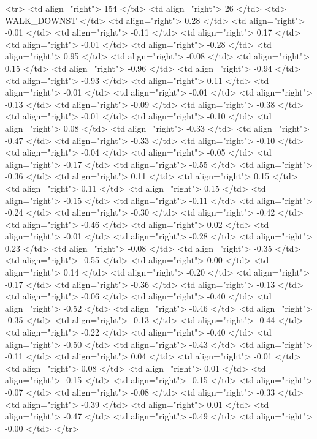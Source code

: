   <tr> <td align="right"> 154 </td> <td align="right">  26 </td> <td> WALK_DOWNST </td> <td align="right"> 0.28 </td> <td align="right"> -0.01 </td> <td align="right"> -0.11 </td> <td align="right"> 0.17 </td> <td align="right"> -0.01 </td> <td align="right"> -0.28 </td> <td align="right"> 0.95 </td> <td align="right"> -0.08 </td> <td align="right"> 0.15 </td> <td align="right"> -0.96 </td> <td align="right"> -0.94 </td> <td align="right"> -0.93 </td> <td align="right"> 0.11 </td> <td align="right"> -0.01 </td> <td align="right"> -0.01 </td> <td align="right"> -0.13 </td> <td align="right"> -0.09 </td> <td align="right"> -0.38 </td> <td align="right"> -0.01 </td> <td align="right"> -0.10 </td> <td align="right"> 0.08 </td> <td align="right"> -0.33 </td> <td align="right"> -0.47 </td> <td align="right"> -0.33 </td> <td align="right"> -0.10 </td> <td align="right"> -0.04 </td> <td align="right"> -0.05 </td> <td align="right"> -0.17 </td> <td align="right"> -0.55 </td> <td align="right"> -0.36 </td> <td align="right"> 0.11 </td> <td align="right"> 0.15 </td> <td align="right"> 0.11 </td> <td align="right"> 0.15 </td> <td align="right"> -0.15 </td> <td align="right"> -0.11 </td> <td align="right"> -0.24 </td> <td align="right"> -0.30 </td> <td align="right"> -0.42 </td> <td align="right"> -0.46 </td> <td align="right"> 0.02 </td> <td align="right"> -0.01 </td> <td align="right"> -0.28 </td> <td align="right"> 0.23 </td> <td align="right"> -0.08 </td> <td align="right"> -0.35 </td> <td align="right"> -0.55 </td> <td align="right"> 0.00 </td> <td align="right"> 0.14 </td> <td align="right"> -0.20 </td> <td align="right"> -0.17 </td> <td align="right"> -0.36 </td> <td align="right"> -0.13 </td> <td align="right"> -0.06 </td> <td align="right"> -0.40 </td> <td align="right"> -0.52 </td> <td align="right"> -0.46 </td> <td align="right"> -0.35 </td> <td align="right"> -0.13 </td> <td align="right"> -0.44 </td> <td align="right"> -0.22 </td> <td align="right"> -0.40 </td> <td align="right"> -0.50 </td> <td align="right"> -0.43 </td> <td align="right"> -0.11 </td> <td align="right"> 0.04 </td> <td align="right"> -0.01 </td> <td align="right"> 0.08 </td> <td align="right"> 0.01 </td> <td align="right"> -0.15 </td> <td align="right"> -0.15 </td> <td align="right"> -0.07 </td> <td align="right"> -0.08 </td> <td align="right"> -0.33 </td> <td align="right"> -0.39 </td> <td align="right"> 0.01 </td> <td align="right"> -0.47 </td> <td align="right"> -0.49 </td> <td align="right"> -0.00 </td> </tr>
